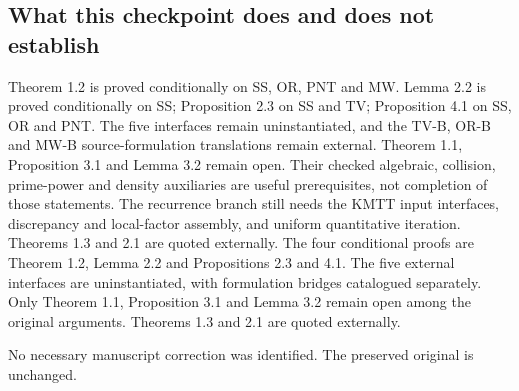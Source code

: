 \ifDetailed\else\small\fi


\normalsize

\subsection*{What this checkpoint does and does not establish}
\ifDetailed
Theorem 1.2 is proved conditionally on SS, OR, PNT and MW. Lemma 2.2 is proved conditionally on SS; Proposition 2.3 on SS and TV; Proposition 4.1 on SS, OR and PNT. The five interfaces remain uninstantiated, and the TV-B, OR-B and MW-B source-formulation translations remain external. Theorem 1.1, Proposition 3.1 and Lemma 3.2 remain open. Their checked algebraic, collision, prime-power and density auxiliaries are useful prerequisites, not completion of those statements. The recurrence branch still needs the KMTT input interfaces, discrepancy and local-factor assembly, and uniform quantitative iteration. Theorems 1.3 and 2.1 are quoted externally.
\else
The four conditional proofs are Theorem 1.2, Lemma 2.2 and Propositions 2.3 and 4.1. The five external interfaces are uninstantiated, with formulation bridges catalogued separately. Only Theorem 1.1, Proposition 3.1 and Lemma 3.2 remain open among the original arguments. Theorems 1.3 and 2.1 are quoted externally.
\fi

\ifDetailed No necessary manuscript correction was identified. The preserved original is unchanged.\fi
